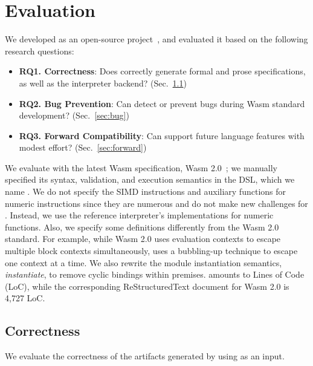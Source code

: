 \section{Evaluation}
\label{sec:eval}
We developed \dslname as an open-source project~\cite{spectec}, and
evaluated it based on the following research questions:
\begin{itemize}
\item \textbf{RQ1. Correctness}:
Does \dslname correctly generate formal and prose specifications, as well as the interpreter backend?
(Sec.~\ref{sec:correctness})
\item \textbf{RQ2. Bug Prevention}:
Can \dslname detect or prevent bugs during Wasm standard development?
(Sec.~\ref{sec:bug})
\item \textbf{RQ3. Forward Compatibility}:
Can \dslname support future language features with modest effort?
(Sec.~\ref{sec:forward})
\end{itemize}

We evaluate \dslname with the latest Wasm specification, Wasm 2.0~\cite{wasmspec};
we manually specified its syntax, validation, and execution semantics
in the DSL, which we name \specdsl. We do not specify the SIMD
instructions and auxiliary functions for numeric instructions
since they are numerous and do not make new challenges for \dslname.
Instead, we use the reference interpreter's implementations for numeric functions.
Also, we specify some definitions differently from the Wasm 2.0 standard.
For example, while Wasm 2.0 uses evaluation contexts to escape multiple block contexts
simultaneously, \specdsl uses a bubbling-up technique to escape one context at a time.
We also rewrite the module instantiation semantics, \textit{instantiate},
to remove cyclic bindings within premises.
\specdsl amounts to  Lines of Code (LoC),
while the corresponding ReStructuredText document for Wasm 2.0 is 4,727 LoC.

\subsection{Correctness}\label{sec:correctness}
We evaluate the correctness of the artifacts generated by \dslname using \specdsl as an input.

